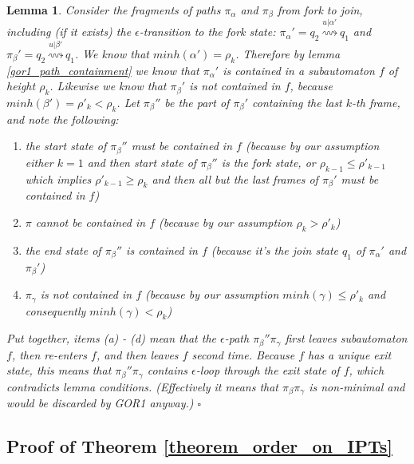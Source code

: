 \documentclass[AMA,STIX1COL]{WileyNJD-v2}
\newtheorem{XLem}{Lemma}
\begin{document}
\begin{XLem}
    Consider the fragments of paths $\pi_\alpha$ and $\pi_\beta$ from fork to join,
    including (if it exists) the $\epsilon$-transition to the fork state:
    $\pi_\alpha' = q_2 \overset {u | \alpha'} {\rightsquigarrow} q_1$ and
    $\pi_\beta' = q_2 \overset {u | \beta'} {\rightsquigarrow} q_1$.
    We know that $minh (\alpha') = \rho_k$.
    Therefore by lemma \ref{gor1_path_containment}
    we know that $\pi_\alpha'$ is contained in a subautomaton $f$ of height $\rho_k$.
    Likewise we know that $\pi_\beta'$ is not contained in $f$, because $minh (\beta') = \rho'_k < \rho_k$.
    Let $\pi_\beta''$ be the part of $\pi_\beta'$ containing the last $k$-th frame,
    and note the following:
    \begin{enumerate}
        \item[(a)] the start state of $\pi_\beta''$ must be contained in $f$
            (because by our assumption
            either $k = 1$ and then start state of $\pi_\beta''$ is the fork state,
            or $\rho_{k-1} \leq \rho'_{k-1}$ which implies $\rho'_{k-1} \geq \rho_k$
            and then all but the last frames of $\pi_\beta'$ must be contained in $f$)
        \item[(b)] $\pi$ cannot be contained in $f$
            (because by our assumption $\rho_k > \rho'_k$)
        \item[(c)] the end state of $\pi_\beta''$ is contained in $f$
            (because it's the join state $q_1$ of $\pi_\alpha'$ and $\pi_\beta'$)
        \item[(d)] $\pi_\gamma$ is not contained in $f$
            (because by our assumption $minh (\gamma) \leq \rho'_k$ and consequently $minh (\gamma) < \rho_k$)
    \end{enumerate}
    Put together, items (a) - (d) mean that the $\epsilon$-path $\pi_\beta'' \pi_\gamma$
    first leaves subautomaton $f$, then re-enters $f$, and then leaves $f$ second time.
    Because $f$ has a unique exit state, this means that $\pi_\beta'' \pi_\gamma$ contains $\epsilon$-loop
    through the exit state of $f$, which contradicts lemma conditions.
    (Effectively it means that $\pi_\beta \pi_\gamma$ is non-minimal and would be discarded by GOR1 anyway.)
    $\square$
    \end{XLem}

\subsection*{Proof of Theorem \ref{theorem_order_on_IPTs}}
\end{document}
